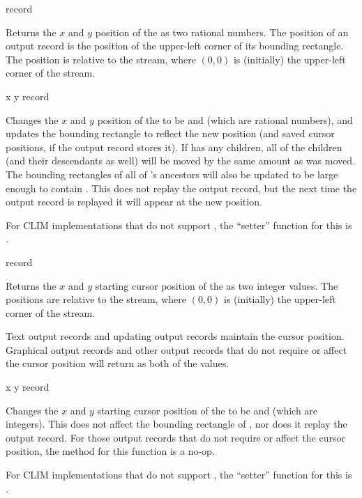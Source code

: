  {record}

Returns the $x$ and $y$ position of the   as two
rational numbers.  The position of an output record is the position of the
upper-left corner of its bounding rectangle.  The position is relative to the
stream, where $(0,0)$ is (initially) the upper-left corner of the stream.

 {x y record}

Changes the $x$ and $y$ position of the   to be
 and  (which are rational numbers), and updates the bounding
rectangle to reflect the new position (and saved cursor positions, if the output
record stores it).  If  has any children, all of the children (and
their descendants as well) will be moved by the same amount as  was
moved.  The bounding rectangles of all of 's ancestors will also be
updated to be large enough to contain .  This does not replay the
output record, but the next time the output record is replayed it will appear at
the new position.

For CLIM implementations that do not support , the ``setter'' function
for this is .

 {record}

Returns the $x$ and $y$ starting cursor position of the 
 as two integer values.  The positions are relative to the stream,
where $(0,0)$ is (initially) the upper-left corner of the stream.

Text output records and updating output records maintain the cursor position.
Graphical output records and other output records that do not require or affect
the cursor position will return  as both of the values.

 {x y record}

Changes the $x$ and $y$ starting cursor position of the 
 to be  and  (which are integers).  This does not
affect the bounding rectangle of , nor does it replay the output
record.  For those output records that do not require or affect the cursor
position, the method for this function is a no-op.

For CLIM implementations that do not support , the ``setter'' function
for this is .

